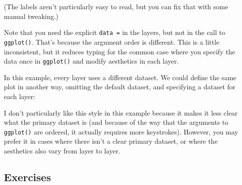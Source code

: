 (The labels aren't particularly easy to read, but you can fix that with
some manual tweaking.)

Note that you need the explicit \texttt{data\ =} in the layers, but not
in the call to \texttt{ggplot()}. That's because the argument order is
different. This is a little inconsistent, but it reduces typing for the
common case where you specify the data once in \texttt{ggplot()} and
modify aesthetics in each layer.

In this example, every layer uses a different dataset. We could define
the same plot in another way, omitting the default dataset, and
specifying a dataset for each layer:

\begin{Shaded}
\begin{Highlighting}[]
\NormalTok{(} \StringTok{ }
\StringTok{  }\NormalTok{(} \StringTok{ }
\StringTok{  }\NormalTok{(} \StringTok{ }
\StringTok{  }\NormalTok{(} \NormalTok{(} 
\end{Highlighting}
\end{Shaded}

I don't particularly like this style in this example because it makes it
less clear what the primary dataset is (and because of the way that the
arguments to \texttt{ggplot()} are ordered, it actually requires more
keystrokes). However, you may prefer it in cases where there isn't a
clear primary dataset, or where the aesthetics also vary from layer to
layer.

\subsection{Exercises}

